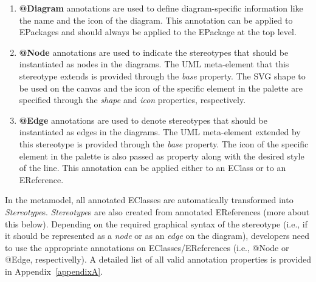 \begin{enumerate}[label=\arabic*.]
	\item \textbf{@Diagram} annotations are used to define diagram-specific information like the name and the icon of the diagram. This annotation can be applied to EPackages and should always be applied to the EPackage at the top level.
	\item \textbf{@Node} annotations are used to indicate the stereotypes that should be instantiated as nodes in the diagrams. 
	The UML meta-element that this stereotype extends is provided through the \emph{base} property. 
	The SVG shape to be used on the canvas and the icon of the specific element in the palette are specified through the \emph{shape} and \emph{icon} properties, respectively. 
	\item \textbf{@Edge} annotations are used to denote stereotypes that should be instantiated as edges in the diagrams. 
	The UML meta-element extended by this stereotype is provided through the \emph{base} property. The icon of the specific element in the palette is also passed as property along with the desired style of the line. 
	This annotation can be applied either to an EClass or to an EReference.
\end{enumerate}

In the metamodel, all annotated EClasses are automatically transformed into \textit{Stereotype}s.
\textit{Stereotype}s are also created from annotated EReferences (more about this below). 
Depending on the required graphical syntax of the stereotype (i.e., if it should be represented as a \textit{node} or as an \textit{edge} on the diagram), developers need to use the appropriate annotations on EClasses/EReferences (i.e., @Node or @Edge, respectivelly). 
A detailed list of all valid annotation properties is provided in Appendix~\ref{appendixA}. 

